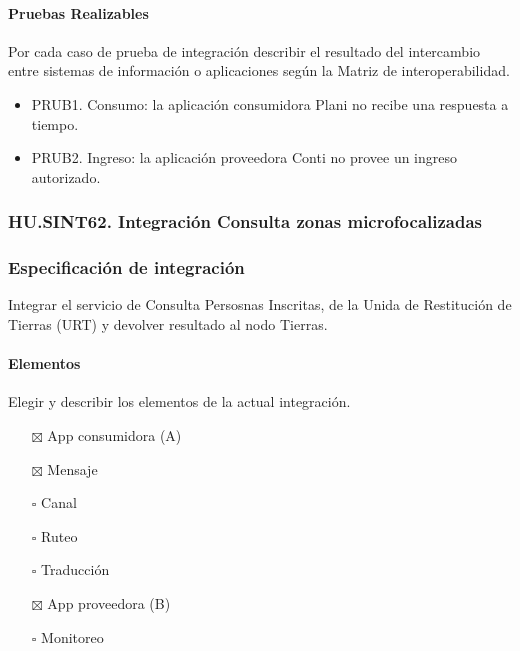 \documentclass[
  paper=a4,
  ,captions=tableheading
]{scrartcl}
\providecommand{\tightlist}{%
  \setlength{\itemsep}{0pt}\setlength{\parskip}{0pt}}
\begin{document}
\paragraph{Pruebas Realizables}\label{sec:pruebas-realizables-2}

Por cada caso de prueba de integración describir el resultado del
intercambio entre sistemas de información o aplicaciones según la Matriz
de interoperabilidad.

\begin{itemize}
\tightlist
\item
  PRUB1. Consumo: la aplicación consumidora Plani no recibe una
  respuesta a tiempo.
\item
  PRUB2. Ingreso: la aplicación proveedora Conti no provee un ingreso
  autorizado.
\end{itemize}

\subsubsection{HU.SINT62. Integración Consulta zonas
microfocalizadas}\label{sec:hu.sint62.-integraciuxf3n-consulta-zonas-microfocalizadas}

\subsubsection{Especificación de
integración}\label{sec:especificaciuxf3n-de-integraciuxf3n-3}

Integrar el servicio de Consulta Persosnas Inscritas, de la Unida de
Restitución de Tierras (URT) y devolver resultado al nodo Tierras.

\paragraph{Elementos}\label{sec:elementos-3}

Elegir y describir los elementos de la actual integración.

\begin{itemize}
\tightlist
\item[$\boxtimes$]
  App consumidora (A)
\item[$\boxtimes$]
  Mensaje
\item[$\square$]
  Canal
\item[$\square$]
  Ruteo
\item[$\square$]
  Traducción
\item[$\boxtimes$]
  App proveedora (B)
\item[$\square$]
  Monitoreo
\end{itemize}
\end{document}
